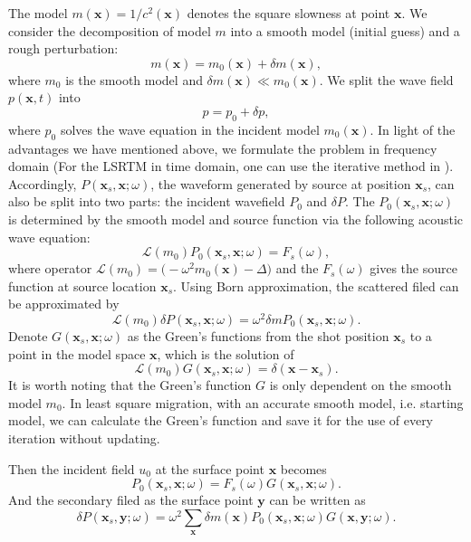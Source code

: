 \documentclass[11pt]{article}
\newcommand{\cL}{\mathcal{L}}
\newcommand{\bx}{\boldsymbol{x}}
\newcommand{\by}{\boldsymbol{y}}
\theoremstyle{plain}
\theoremstyle{definition}
\theoremstyle{remark}
\numberwithin{equation}{section}
\begin{document}
The model $m(\bx)=1/c^2(\bx)$ denotes the square slowness at point $\bx$. 
We consider the decomposition of model $m$ into a smooth model (initial guess) and a rough perturbation:
\begin{equation}
m(\bx)=m_0(\bx)+\delta m(\bx),
\end{equation} 
where $m_0$ is the smooth model and $\delta m(\bx) \ll m_0(\bx)$. We split the wave field $p(\bx,t)$ into 
\begin{equation}
p=p_0+\delta p,
\end{equation}
where $p_0$ solves the wave equation in the incident model $m_0(\bx)$.
In light of the advantages we have mentioned above, we formulate the problem in frequency domain (For the LSRTM in time domain, one can use the iterative method in \cite{Dong:2012aa}).
Accordingly, $P(\bx_s,\bx;\omega)$, the waveform generated by source at position $\bx_s$, can also be split into two parts: the incident wavefield $P_0$
and $\delta P$. The $P_0(\bx_s,\bx;\omega)$ is determined by the smooth model and source function via the following acoustic wave equation:
\begin{equation}
\cL( m_0) P_0(\bx_s,\bx; \omega)=F_s(\omega),
\end{equation} 
where operator $\cL( m_0)=\Big(-\omega^2 m_0(\bx)-\Delta\Big)$ and the $F_s(\omega)$ gives the source function at source location $\bx_s$. 
Using Born approximation, the scattered filed can be approximated by  
\begin{equation}
\cL( m_0)\delta P(\bx_s,\bx;\omega) =\omega^2 \delta m P_0(\bx_s,\bx;\omega).
\end{equation}
Denote $G(\bx_s,\bx; \omega)$ as the Green's functions from the shot position $\bx_s$ to a point in the model space $\bx$, which is the solution of 
\begin{equation}
\cL(m_0)G(\bx_s,\bx;\omega)=\delta(\bx-\bx_s).
\end{equation}
It is worth noting that the Green's function $G$ is only dependent on the smooth model 
$m_0$. In least square migration, with an accurate smooth model, i.e. starting model, we can calculate the Green's function and save it for the use of every iteration without updating. 
  
Then the incident field $u_0$ at the surface point $\bx$ becomes
\begin{equation}
P_0(\bx_s,\bx; \omega)=F_s(\omega)G(\bx_s,\bx; \omega).
\end{equation}
And the secondary filed as the surface point $\by$ can be written as 
\begin{equation}
\delta P(\bx_s,\by; \omega)=\omega^2 \sum_{\bx}  \delta m(\bx) P_0(\bx_s,\bx;\omega) G(\bx,\by;\omega).
\end{equation}
\end{document}
